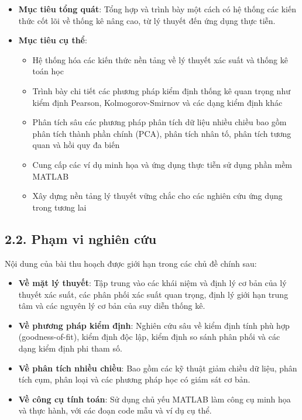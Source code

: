 \begin{itemize}
    \item \textbf{Mục tiêu tổng quát}: Tổng hợp và trình bày một cách có hệ thống các kiến thức cốt lõi về thống kê nâng cao, từ lý thuyết đến ứng dụng thực tiễn.
    
    \item \textbf{Mục tiêu cụ thể}:
    \begin{itemize}
        \item Hệ thống hóa các kiến thức nền tảng về lý thuyết xác suất và thống kê toán học
        \item Trình bày chi tiết các phương pháp kiểm định thống kê quan trọng như kiểm định Pearson, Kolmogorov-Smirnov và các dạng kiểm định khác
        \item Phân tích sâu các phương pháp phân tích dữ liệu nhiều chiều bao gồm phân tích thành phần chính (PCA), phân tích nhân tố, phân tích tương quan và hồi quy đa biến
        \item Cung cấp các ví dụ minh họa và ứng dụng thực tiễn sử dụng phần mềm MATLAB
        \item Xây dựng nền tảng lý thuyết vững chắc cho các nghiên cứu ứng dụng trong tương lai
    \end{itemize}
\end{itemize}

\subsection*{2.2. Phạm vi nghiên cứu}

Nội dung của bài thu hoạch được giới hạn trong các chủ đề chính sau:

\begin{itemize}
    \item \textbf{Về mặt lý thuyết}: Tập trung vào các khái niệm và định lý cơ bản của lý thuyết xác suất, các phân phối xác suất quan trọng, định lý giới hạn trung tâm và các nguyên lý cơ bản của suy diễn thống kê.
    
    \item \textbf{Về phương pháp kiểm định}: Nghiên cứu sâu về kiểm định tính phù hợp (goodness-of-fit), kiểm định độc lập, kiểm định so sánh phân phối và các dạng kiểm định phi tham số.
    
    \item \textbf{Về phân tích nhiều chiều}: Bao gồm các kỹ thuật giảm chiều dữ liệu, phân tích cụm, phân loại và các phương pháp học có giám sát cơ bản.
    
    \item \textbf{Về công cụ tính toán}: Sử dụng chủ yếu MATLAB làm công cụ minh họa và thực hành, với các đoạn code mẫu và ví dụ cụ thể.
\end{itemize}

